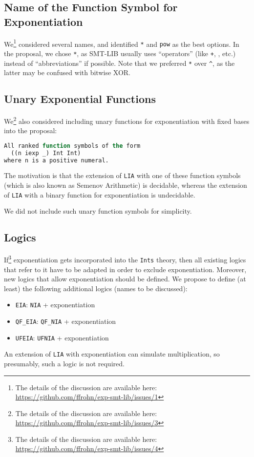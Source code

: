 \documentclass{article}
\begin{document}
\subsection{Name of the Function Symbol for Exponentiation}

We\footnote{The details of the discussion are available here: \url{https://github.com/ffrohn/exp-smt-lib/issues/1}} considered several names, and identified {\tt **} and {\tt pow} as the best options.
%
In the proposal, we chose {\tt **}, as SMT-LIB usually uses ``operators'' (like {\tt +}, {\tt *}, etc.) instead of ``abbreviations'' if possible.
%
Note that we preferred {\tt **} over {\tt \^{}}, as the latter may be confused with bitwise XOR.

\subsection{Unary Exponential Functions}

We\footnote{The details of the discussion are available here: \url{https://github.com/ffrohn/exp-smt-lib/issues/3}} also considered including unary functions for exponentiation with fixed bases into the proposal:
%
\begin{lstlisting}[language=Lisp]
All ranked function symbols of the form
  ((n iexp _) Int Int)
where n is a positive numeral.
\end{lstlisting}
%
The motivation is that the extension of {\tt LIA} with one of these function symbols (which is also known as Semenov Arithmetic) is decidable, whereas the extension of {\tt LIA} with a binary function for exponentiation is undecidable.

We did not include such unary function symbols for simplicity.

\subsection{Logics}

If\footnote{The details of the discussion are available here: \url{https://github.com/ffrohn/exp-smt-lib/issues/4}} exponentiation gets incorporated into the {\tt Ints} theory, then all existing logics that refer to it have to be adapted in order to exclude exponentiation.
%
Moreover, new logics that allow exponentiation should be defined.
%
We propose to define (at least) the following additional logics (names to be discussed):
%
\begin{itemize}
\item {\tt EIA}: {\tt NIA} + exponentiation
\item {\tt QF\_EIA}: {\tt QF\_NIA} + exponentiation
\item {\tt UFEIA}: {\tt UFNIA} + exponentiation
\end{itemize}
%
An extension of {\tt LIA} with exponentiation can simulate multiplication, so presumably, such a logic is not required.


\end{document}
